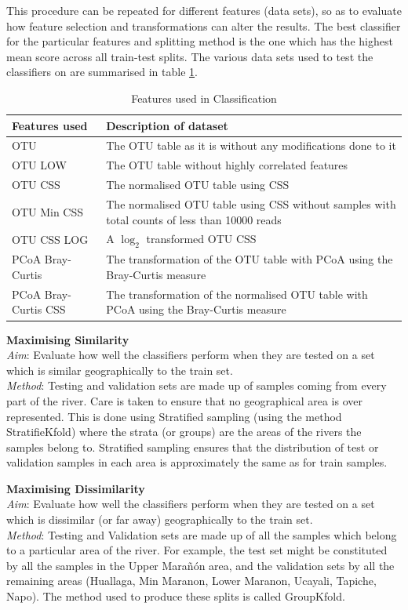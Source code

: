 This procedure can be repeated for different features (data sets), so as to evaluate how feature selection and transformations can alter the results. The best classifier for the particular features and splitting method is the one which has the highest mean score across all train-test splits. The various data sets used to test the classifiers on are summarised in table \ref{table:features}.
\begin{table}
	\caption{Features used in Classification}
	\centering
	\label{table:features}
	\begin{tabularx}{\textwidth}{l X  }
		\hline 
		Features used &Description of dataset\\ 
		
		\hline
		OTU &The OTU table as it is without any modifications done to it \\
		OTU LOW & The OTU table without highly correlated features\\
		OTU CSS & The normalised OTU table using CSS\\
		OTU Min CSS & The normalised OTU table using CSS without samples with total counts of less than 10000 reads  \\
		OTU CSS LOG & A $\log_2$ transformed OTU CSS \\
		PCoA Bray-Curtis &The transformation of the OTU table with PCoA using the Bray-Curtis measure  \\
		PCoA Bray-Curtis CSS &The transformation of the normalised OTU table with PCoA using the Bray-Curtis measure\\
		
		\hline 
	\end{tabularx}
\end{table}

\large{\bf Maximising Similarity} \\
\textit{Aim}: Evaluate how well the classifiers perform when they are tested on a set which is similar geographically to the train set.\\
\textit{Method}: Testing and validation sets are made up of samples coming from every part of the river. Care is taken to ensure that no geographical area is over represented. This is done using Stratified sampling (using the method StratifieKfold) where the strata (or groups) are the areas of the rivers the samples belong to. Stratified sampling ensures that the distribution of test or validation samples in each area is approximately the same as for train samples.




\large{ \bf Maximising Dissimilarity}\\
\textit{Aim}: Evaluate how well the classifiers perform when they are tested on a set which is dissimilar (or far away) geographically to the train set.\\
\textit{Method}: Testing and Validation sets are made up of all the samples which belong to a particular area of the river. For example, the test set might be constituted by all the samples in the Upper Marañón area, and the validation sets by all the remaining areas (Huallaga, Min Maranon, Lower Maranon, Ucayali, Tapiche, Napo). The method used to produce these splits is called GroupKfold.

